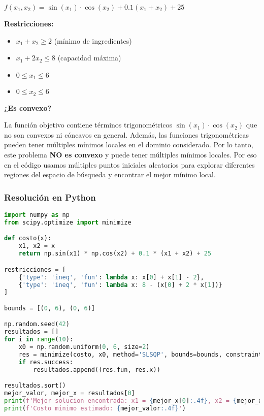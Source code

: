 \documentclass[12pt]{article}
\begin{document}
\begin{center}
$\displaystyle f(x_1, x_2) = \sin(x_1) \cdot \cos(x_2) + 0.1(x_1 + x_2) + 25$
\end{center}

\textbf{Restricciones:}
\begin{itemize}
    \item $x_1 + x_2 \geq 2$ (mínimo de ingredientes)
    \item $x_1 + 2x_2 \leq 8$ (capacidad máxima)
    \item $0 \leq x_1 \leq 6$
    \item $0 \leq x_2 \leq 6$
\end{itemize}

\vspace{0.3em}

\textbf{¿Es convexo?}

\vspace{0.3em}

La función objetivo contiene términos trigonométricos $\sin(x_1) \cdot \cos(x_2)$ que no son convexos ni cóncavos en general. Además, las funciones trigonométricas pueden tener múltiples mínimos locales en el dominio considerado. Por lo tanto, este problema \textbf{NO es convexo} y puede tener múltiples mínimos locales. Por eso en el código usamos múltiples puntos iniciales aleatorios para explorar diferentes regiones del espacio de búsqueda y encontrar el mejor mínimo local.

\subsubsection{Resolución en Python}

\begin{lstlisting}[language=Python]
import numpy as np
from scipy.optimize import minimize

def costo(x):
    x1, x2 = x
    return np.sin(x1) * np.cos(x2) + 0.1 * (x1 + x2) + 25

restricciones = [
    {'type': 'ineq', 'fun': lambda x: x[0] + x[1] - 2},
    {'type': 'ineq', 'fun': lambda x: 8 - (x[0] + 2 * x[1])}
]

bounds = [(0, 6), (0, 6)]

np.random.seed(42)
resultados = []
for i in range(10):
    x0 = np.random.uniform(0, 6, size=2)
    res = minimize(costo, x0, method='SLSQP', bounds=bounds, constraints=restricciones)
    if res.success:
        resultados.append((res.fun, res.x))

resultados.sort()
mejor_valor, mejor_x = resultados[0]
print(f'Mejor solucion encontrada: x1 = {mejor_x[0]:.4f}, x2 = {mejor_x[1]:.4f}')
print(f'Costo minimo estimado: {mejor_valor:.4f}')
\end{lstlisting}
\end{document}
